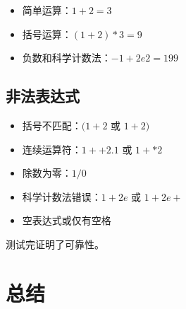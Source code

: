 \documentclass[12pt]{article}
\begin{document}
\begin{itemize}
    \item 简单运算：$1+2 = 3$
    \item 括号运算：$(1+2)*3 = 9$
    \item 负数和科学计数法：$-1 + 2e2 = 199$
\end{itemize}

\subsection{非法表达式}

\begin{itemize}
    \item 括号不匹配：$(1+2$ 或 $1+2)$
    \item 连续运算符：$1++2.1$ 或 $1 +* 2$
    \item 除数为零：$1/0$
    \item 科学计数法错误：$1 + 2e$ 或 $1 + 2e+$
    \item 空表达式或仅有空格
\end{itemize}

测试完证明了可靠性。

\section{总结}
\end{document}

